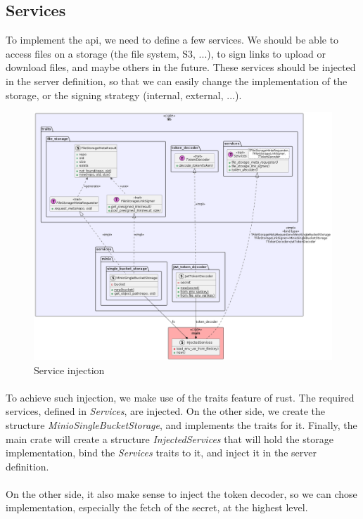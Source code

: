 \subsection{Services}

To implement the api, we need to define a few services. We should be able to access files on a storage (the file system, S3, ...), to sign links to upload or download files, and maybe others in the future. These services should be injected in the server definition, so that we can easily change the implementation of the storage, or the signing strategy (internal, external, ...).

\begin{figure}[H]
    \centering
    \includegraphics[width=\textwidth]{iteration_03/diagrams/services_injection.png}
    \caption{Service injection}
    \label{fig:services_injection}
\end{figure}

\paragraph{}
To achieve such injection, we make use of the traits feature of rust. The required services, defined in \textit{Services}, are injected. On the other side, we create the structure \textit{MinioSingleBucketStorage}, and implements the traits for it. Finally, the main crate will create a structure \textit{InjectedServices} that will hold the storage implementation, bind the \textit{Services} traits to it, and inject it in the server definition.

\paragraph{}
On the other side, it also make sense to inject the token decoder, so we can chose implementation, especially the fetch of the secret, at the highest level. 
